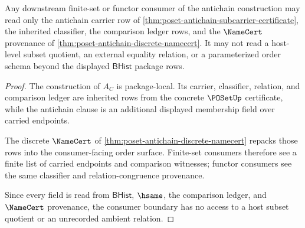 \begin{theorem}
\label{thm:poset-antichain-functor-consumer-boundary}
Any downstream finite-set or functor consumer of the antichain construction may
read only the antichain carrier row of
\autoref{thm:poset-antichain-subcarrier-certificate}, the inherited classifier,
the comparison ledger rows, and the $\NameCert$ provenance of
\autoref{thm:poset-antichain-discrete-namecert}. It may not read a host-level
subset quotient, an external equality relation, or a parameterized order
schema beyond the displayed $\mathsf{BHist}$ package rows.
\end{theorem}
\begin{proof}
The construction of $A_C$ is package-local. Its carrier, classifier, relation,
and comparison ledger are inherited rows from the concrete $\POSetUp$
certificate, while the antichain clause is an additional displayed membership
field over carried endpoints.

The discrete $\NameCert$ of
\autoref{thm:poset-antichain-discrete-namecert} repacks those rows into the
consumer-facing order surface. Finite-set consumers therefore see a finite
list of carried endpoints and comparison witnesses; functor consumers see the
same classifier and relation-congruence provenance.

Since every field is read from $\mathsf{BHist}$, $\hsame$, the comparison
ledger, and $\NameCert$ provenance, the consumer boundary has no access to a
host subset quotient or an unrecorded ambient relation.
\end{proof}

